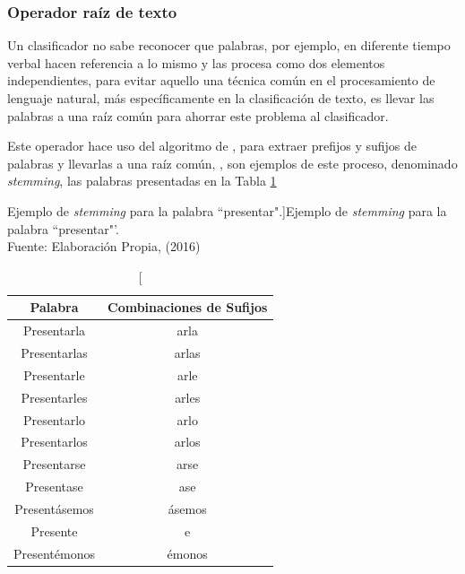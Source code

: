 \subsubsection*{Operador raíz de texto}
\label{subsubsec:6op}

Un clasificador no sabe reconocer que palabras, por ejemplo, en diferente tiempo verbal hacen referencia a lo mismo y las procesa como dos elementos independientes, para evitar aquello una técnica común en el procesamiento de lenguaje natural, más específicamente en la clasificación de texto, es llevar las palabras a una raíz común para ahorrar este problema al clasificador.

Este operador hace uso del algoritmo de \cite{Porter}, para extraer prefijos y sufijos de palabras y llevarlas a una raíz común, \cite{StemmingLema}, son ejemplos de este proceso, denominado \textit{stemming}, las palabras presentadas en la Tabla \ref{tab:ejstemming}

\begin{table}[H]
\centering
\caption[Ejemplo de \textit{stemming} para la palabra ``presentar".]{Ejemplo de \textit{stemming} para la palabra ``presentar"'.\\Fuente: Elaboración Propia, (2016)}
\label{tab:ejstemming}
\begin{tabular}{|c|c|}
\hline
\textbf{Palabra} & \textbf{Combinaciones de Sufijos} \\ \hline
Presentarla      & arla                              \\ \hline
Presentarlas     & arlas                             \\ \hline
Presentarle      & arle                              \\ \hline
Presentarles     & arles                             \\ \hline
Presentarlo      & arlo                              \\ \hline
Presentarlos     & arlos                             \\ \hline
Presentarse      & arse                              \\ \hline
Presentase       & ase                               \\ \hline
Presentásemos    & ásemos                            \\ \hline
Presente         & e                                 \\ \hline
Presentémonos    & émonos                            \\ \hline
\end{tabular}
\end{table}

